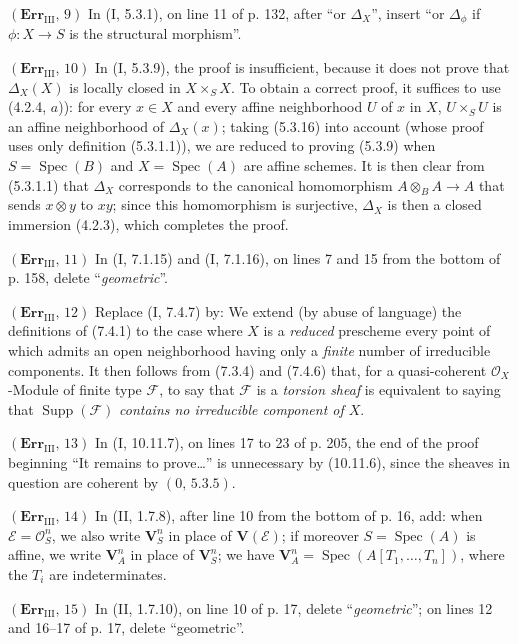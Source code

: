 \documentclass[10pt,oneside]{book}
\newcommand{\sh}[1]{\mathscr{#1}}
\newcommand{\vphi}{\phi}
\newcommand{\Spec}{\operatorname{Spec}}
\begin{document}
\noindent\textbf{$(\mathbf{Err}_{\mathrm{III}},\,9)$} In (I, 5.3.1), on line
11 of p. 132, after ``or $\Delta_X$'', insert ``or $\Delta_\vphi$ if
$\vphi:X\to S$ is the structural morphism''.

\noindent\textbf{$(\mathbf{Err}_{\mathrm{III}},\,10)$} In (I, 5.3.9), the
proof is insufficient, because it does not prove that $\Delta_X(X)$ is
locally closed in $X\times_SX$. To obtain a correct proof, it suffices to use
(4.2.4, $a$)): for every $x\in X$ and every affine neighborhood $U$ of $x$ in
$X$, $U\times_SU$ is an affine neighborhood of $\Delta_X(x)$; taking (5.3.16)
into account (whose proof uses only definition (5.3.1.1)), we are reduced to
proving (5.3.9) when $S=\Spec(B)$ and $X=\Spec(A)$ are affine schemes. It is
then clear from (5.3.1.1) that $\Delta_X$ corresponds to the canonical
homomorphism $A\otimes_BA\to A$ that sends $x\otimes y$ to $xy$; since this
homomorphism is surjective, $\Delta_X$ is then a closed immersion (4.2.3),
which completes the proof.

\noindent\textbf{$(\mathbf{Err}_{\mathrm{III}},\,11)$} In (I, 7.1.15) and
(I, 7.1.16), on lines 7 and 15 from the bottom of p. 158, delete
``\emph{geometric}''.

\noindent\textbf{$(\mathbf{Err}_{\mathrm{III}},\,12)$} Replace (I, 7.4.7)
by: We extend (by abuse of language) the definitions of (7.4.1) to the case
where $X$ is a \emph{reduced} prescheme every point of which admits an open
neighborhood having only a \emph{finite} number of irreducible components. It
then follows from (7.3.4) and (7.4.6) that, for a quasi-coherent
$\sh{O}_X$-Module of finite type $\sh{F}$, to say that $\sh{F}$ is a
\emph{torsion sheaf} is equivalent to saying that $\operatorname{Supp}(\sh{F})$
\emph{contains no irreducible component of $X$}.

\noindent\textbf{$(\mathbf{Err}_{\mathrm{III}},\,13)$} In (I, 10.11.7), on
lines 17 to 23 of p. 205, the end of the proof beginning ``It remains to
prove\ldots{}'' is unnecessary by (10.11.6), since the sheaves in question
are coherent by $(0,\,5.3.5)$.

\noindent\textbf{$(\mathbf{Err}_{\mathrm{III}},\,14)$} In (II, 1.7.8), after
line 10 from the bottom of p. 16, add: when $\sh{E}=\sh{O}_S^n$, we also write
$\mathbf V_S^n$ in place of $\mathbf V(\sh{E})$; if moreover $S=\Spec(A)$ is
affine, we write $\mathbf V_A^n$ in place of $\mathbf V_S^n$; we have
$\mathbf V_A^n=\Spec(A[T_1,\ldots,T_n])$, where the $T_i$ are indeterminates.

\noindent\textbf{$(\mathbf{Err}_{\mathrm{III}},\,15)$} In (II, 1.7.10), on
line 10 of p. 17, delete ``\emph{geometric}''; on lines 12 and 16--17 of p.
17, delete ``geometric''.
\end{document}
